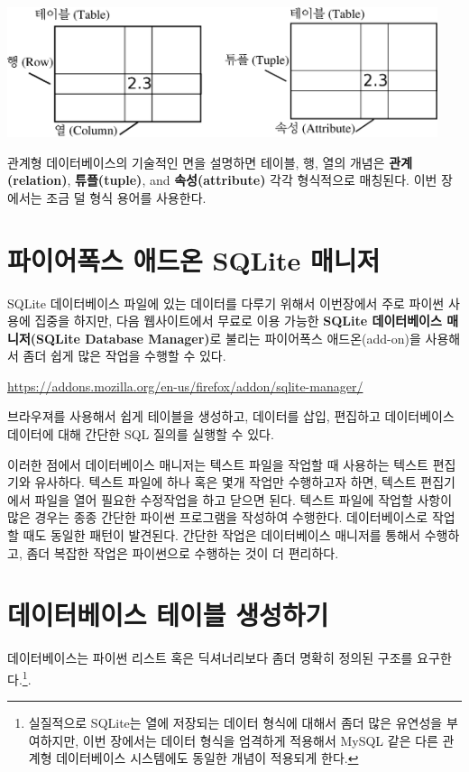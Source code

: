 \beforefig
\centerline{\includegraphics[height=1.50in]{figs2/relational.eps}}
\afterfig

관계형 데이터베이스의 기술적인 면을 설명하면 테이블, 행, 열의 개념은 
{\bf 관계(relation)}, {\bf 튜플(tuple)}, and {\bf 속성(attribute)} 각각 형식적으로 매칭된다.
이번 장에서는 조금 덜 형식 용어를 사용한다.

\section{파이어폭스 애드온 SQLite 매니저}
SQLite 데이터베이스 파일에 있는 데이터를 다루기 위해서 이번장에서 주로 파이썬 사용에 집중을 하지만, 
다음 웹사이트에서 무료로 이용 가능한 {\bf SQLite 데이터베이스 매니저(SQLite Database Manager)}로 불리는 
파이어폭스 애드온(add-on)을 사용해서 좀더 쉽게 많은 작업을 수행할 수 있다.

\url{https://addons.mozilla.org/en-us/firefox/addon/sqlite-manager/}

브라우져를 사용해서 쉽게 테이블을 생성하고, 데이터를 삽입, 편집하고 데이터베이스 데이터에 대해 간단한 SQL 질의를 실행할 수 있다.

이러한 점에서 데이터베이스 매니저는 텍스트 파일을 작업할 때 사용하는 텍스트 편집기와 유사하다.
텍스트 파일에 하나 혹은 몇개 작업만 수행하고자 하면, 텍스트 편집기에서 파일을 열어 필요한 수정작업을 하고 닫으면 된다.
텍스트 파일에 작업할 사항이 많은 경우는 종종 간단한 파이썬 프로그램을 작성하여 수행한다.
데이터베이스로 작업할 때도 동일한 패턴이 발견된다. 
간단한 작업은 데이터베이스 매니저를 통해서 수행하고,
좀더 복잡한 작업은 파이썬으로 수행하는 것이 더 편리하다.


\section{데이터베이스 테이블 생성하기}

데이터베이스는 파이썬 리스트 혹은 딕셔너리보다 좀더 명확히 정의된 구조를 요구한다.\footnote{
실질적으로 SQLite는 열에 저장되는 데이터 형식에 대해서 좀더 많은 유연성을 부여하지만,
이번 장에서는 데이터 형식을 엄격하게 적용해서 MySQL 같은 다른 관계형 데이터베이스 시스템에도 동일한 개념이 적용되게 한다.}.  

